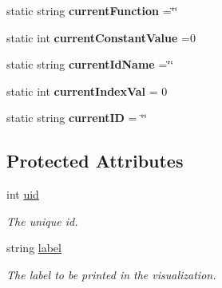 \begin{DoxyCompactItemize}
\item 
\hypertarget{classAST_a5c3cc894d9c0453523dec9ed76f18a04}{static string {\bfseries current\-Function} =\char`\"{}\char`\"{}}\label{classAST_a5c3cc894d9c0453523dec9ed76f18a04}

\item 
\hypertarget{classAST_a66155513b59ff1a04c8ece8b20ec31f5}{static int {\bfseries current\-Constant\-Value} =0}\label{classAST_a66155513b59ff1a04c8ece8b20ec31f5}

\item 
\hypertarget{classAST_a3d031d7bab635ba1f015aade5943f40c}{static string {\bfseries current\-Id\-Name} =\char`\"{}\char`\"{}}\label{classAST_a3d031d7bab635ba1f015aade5943f40c}

\item 
\hypertarget{classAST_a16c4b6e54febc1a26b31a64a46972ef0}{static int {\bfseries current\-Index\-Val} = 0}\label{classAST_a16c4b6e54febc1a26b31a64a46972ef0}

\item 
\hypertarget{classAST_a6fc65ae9dd064a88941d4b88669b19db}{static string {\bfseries current\-I\-D} = \char`\"{}\char`\"{}}\label{classAST_a6fc65ae9dd064a88941d4b88669b19db}

\end{DoxyCompactItemize}
\subsection*{Protected Attributes}
\begin{DoxyCompactItemize}
\item 
\hypertarget{classAST_a847b778f1c3dd5a19de32de432ee6e15}{int \hyperlink{classAST_a847b778f1c3dd5a19de32de432ee6e15}{uid}}\label{classAST_a847b778f1c3dd5a19de32de432ee6e15}

\begin{DoxyCompactList}\small\item\em The unique id. \end{DoxyCompactList}\item 
\hypertarget{classAST_ab2e239ccc0688d2341724432ff5a1a31}{string \hyperlink{classAST_ab2e239ccc0688d2341724432ff5a1a31}{label}}\label{classAST_ab2e239ccc0688d2341724432ff5a1a31}

\begin{DoxyCompactList}\small\item\em The label to be printed in the visualization. \end{DoxyCompactList}\end{DoxyCompactItemize}


